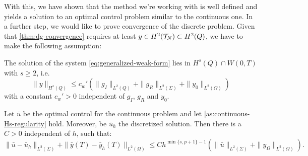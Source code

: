 \documentclass[../thesis.tex]{subfiles}
\begin{document}
With this, we have shown that the method we're working with is well defined and yields a solution to an optimal control problem similar to the continuous one. In a further step, we would like to prove convergence of the discrete problem.
Given that \cref{thm:dg-convergence} requires at least $y \in H^2(\mathcal{T}_N) \subset H^2(Q)$, we have to make the following assumption:
\begin{assumption}
\label{as:continuous-Hs-regularity}
The solution of the system \cref{eq:generalized-weak-form} lies in $H^s(Q) \cap W(0,T)$ with $s \geq 2$, i.e.
\[
	\| y \|_{H^s(Q)} \leq c_w' \left( \| g_I \|_{L^2(Q)} + \| g_R \|_{L^2(\Sigma)} + \| y_0 \|_{L^2(\Omega)} \right)
\]
with a constant $c_w' > 0$ independent of $g_I$, $g_R$ and $y_0$.
\end{assumption}
\begin{theorem}
Let $\bar{u}$ be the optimal control for the continuous problem and let \cref{as:continuous-Hs-regularity} hold. Moreover, be $\bar{u}_h$ the discretized solution.
Then there is a $C > 0$ independent of $h$, such that:
\[
	\| \bar{u} - \bar{u}_h \|_{L^2(\Sigma)} + \| \bar{y}(T) - \bar{y}_h(T) \|_{L^2(\Omega)} \leq C h^{\min \{ s, p+1\} - 1} \left( \| \bar{u} \|_{L^2(\Sigma)} + \| y_\Omega \|_{L^2(\Omega)} \right).
\]
\end{theorem}
\end{document}
